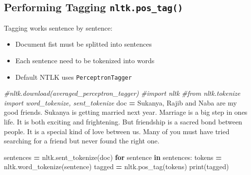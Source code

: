 \documentclass[
]{book}
\newenvironment{Shaded}{\begin{snugshade}}{\end{snugshade}}
\newcommand{\BuiltInTok}[1]{#1}
\newcommand{\CommentTok}[1]{\textcolor[rgb]{0.37,0.37,0.37}{\textit{#1}}}
\newcommand{\ControlFlowTok}[1]{\textcolor[rgb]{0.27,0.27,0.27}{\textbf{#1}}}
\newcommand{\KeywordTok}[1]{\textcolor[rgb]{0.27,0.27,0.27}{\textbf{#1}}}
\newcommand{\NormalTok}[1]{#1}
\newcommand{\OperatorTok}[1]{\textcolor[rgb]{0.43,0.43,0.43}{\textbf{#1}}}
\newcommand{\StringTok}[1]{\textcolor[rgb]{0.5,0.5,0.5}{#1}}
\providecommand{\tightlist}{%
  \setlength{\itemsep}{0pt}\setlength{\parskip}{0pt}}
\begin{document}
\hypertarget{performing-tagging-nltk.pos_tag}{%
\subsection{\texorpdfstring{Performing Tagging \texttt{nltk.pos\_tag()}}{Performing Tagging nltk.pos\_tag()}}\label{performing-tagging-nltk.pos_tag}}

Tagging works sentence by sentence:

\begin{itemize}
\tightlist
\item
  Document fist must be splitted into sentences\\
\item
  Each sentence need to be tokenized into words\\
\item
  Default NTLK uses \texttt{PerceptronTagger}
\end{itemize}

\begin{Shaded}
\begin{Highlighting}[]
\CommentTok{\#nltk.download(\textquotesingle{}averaged\_perceptron\_tagger\textquotesingle{})}
\CommentTok{\#import nltk}
\CommentTok{\#from nltk.tokenize import word\_tokenize, sent\_tokenize }
\NormalTok{doc }\OperatorTok{=} \StringTok{\textquotesingle{}\textquotesingle{}\textquotesingle{}Sukanya, Rajib and Naba are my good friends. Sukanya is getting married next year. Marriage is a big step in one\textquotesingle{}s life. It is both exciting and frightening. But friendship is a sacred bond between people. It is a special kind of love between us. Many of you must have tried searching for a friend but never found the right one.\textquotesingle{}\textquotesingle{}\textquotesingle{}}

\NormalTok{sentences }\OperatorTok{=}\NormalTok{ nltk.sent\_tokenize(doc)}
\ControlFlowTok{for}\NormalTok{ sentence }\KeywordTok{in}\NormalTok{ sentences:}
\NormalTok{  tokens }\OperatorTok{=}\NormalTok{ nltk.word\_tokenize(sentence)}
\NormalTok{  tagged }\OperatorTok{=}\NormalTok{ nltk.pos\_tag(tokens)}
  \BuiltInTok{print}\NormalTok{(tagged)}
\end{Highlighting}
\end{Shaded}
\end{document}
